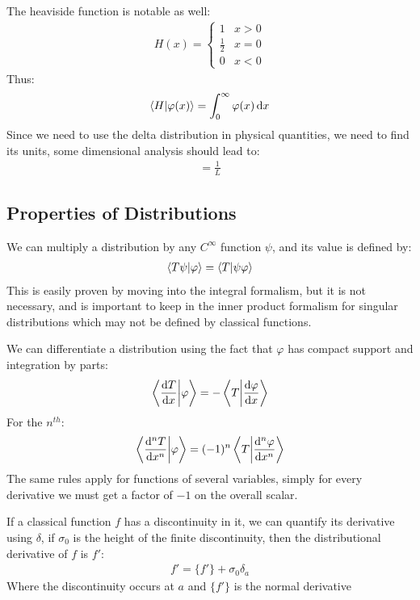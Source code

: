 \documentclass[12pt]{article}
\theoremstyle{plain}
\theoremstyle{definition}
\newcommand{\vphi}{\varphi}
\begin{document}
The heaviside function is notable as well:
\begin{align*}
  H(x)=
  \begin{cases}
    1 & x > 0\\
    \frac12 & x = 0\\
    0 & x < 0
  \end{cases}
\end{align*}
Thus:
\begin{align*}
  \ip{H}{\vphi(x)}=\int_0^\infty\vphi(x)\dd{x}
\end{align*}
Since we need to use the delta distribution in physical quantities, we need to find its units, some dimensional analysis should lead to:
\begin{align*}
  [\delta]=\frac1L
\end{align*}

\subsection{Properties of Distributions}
We can multiply a distribution by any $C^\infty$ function $\psi$, and its value is defined by:
\begin{align*}
  \ip{T\psi}{\vphi}=\ip{T}{\psi\vphi}
\end{align*}
This is easily proven by moving into the integral formalism, but it is not necessary, and is important to keep in the inner product formalism for singular distributions which may not be defined by classical functions.

We can differentiate a distribution using the fact that $\vphi$ has compact support and integration by parts:
\begin{align*}
  \ip{\dv{T}{x}}{\vphi}=-\ip{T}{\dv{\vphi}{x}}
\end{align*}
For the $n^{th}$:
\begin{align*}
  \ip{\dv[n]{T}{x}}{\vphi}=(-1)^n\ip{T}{\dv[n]{\vphi}{x}}
\end{align*}
The same rules apply for functions of several variables, simply for every derivative we must get a factor of $-1$ on the overall scalar.

If a classical function $f$ has a discontinuity in it, we can quantify its derivative using $\delta$, if $\sigma_0$ is the height of the finite discontinuity, then the distributional derivative of $f$ is $f'$:
\begin{align*}
  f'=\{f'\}+\sigma_0\delta_a
\end{align*}
Where the discontinuity occurs at $a$ and $\{f'\}$ is the normal derivative
\end{document}
